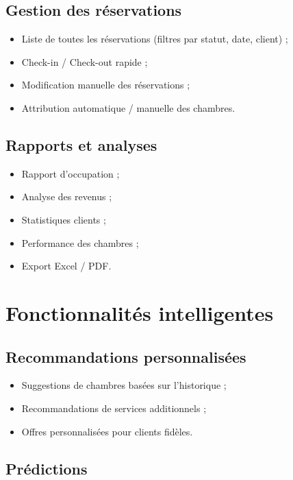 \documentclass[12pt,a4paper]{report}
\begin{document}
\subsection{Gestion des réservations}

\begin{itemize}
  \item Liste de toutes les réservations (filtres par statut, date, client) ;
  \item Check-in / Check-out rapide ;
  \item Modification manuelle des réservations ;
  \item Attribution automatique / manuelle des chambres.
\end{itemize}

\subsection{Rapports et analyses}

\begin{itemize}
  \item Rapport d'occupation ;
  \item Analyse des revenus ;
  \item Statistiques clients ;
  \item Performance des chambres ;
  \item Export Excel / PDF.
\end{itemize}

\section{Fonctionnalités intelligentes}

\subsection{Recommandations personnalisées}

\begin{itemize}
  \item Suggestions de chambres basées sur l'historique ;
  \item Recommandations de services additionnels ;
  \item Offres personnalisées pour clients fidèles.
\end{itemize}

\subsection{Prédictions}
\end{document}
